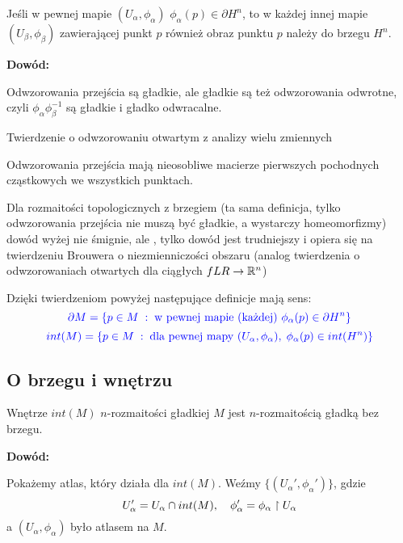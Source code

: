 \begin{fakt}
Jeśli w pewnej mapie $(U_\alpha,\phi_\alpha)$ $\phi_\alpha(p)\in\partial H^n$, to w każdej innej mapie $(U_\beta,\phi_\beta)$ zawierającej punkt $p$ również obraz punktu $p$ należy do brzegu $H^n$.
\end{fakt}

\textbf{Dowód:}

Odwzorowania przejścia są gładkie, ale gładkie są też odwzorowania odwrotne, czyli $\phi_\alpha\phi_\beta^{-1}$ są gładkie i gładko odwracalne.

Twierdzenie o odwzorowaniu otwartym z analizy wielu zmiennych

Odwzorowania przejścia mają nieosobliwe macierze pierwszych pochodnych cząstkowych we wszystkich punktach.
\proofend
\medskip

\begin{uwaga}
    Dla rozmaitości topologicznych z brzegiem (ta sama definicja, tylko odwzorowania przejścia nie muszą być gładkie, a wystarczy homeomorfizmy) dowód wyżej nie śmignie, ale , tylko dowód jest trudniejszy i opiera się na twierdzeniu Brouwera o niezmienniczości obszaru (analog twierdzenia o odwzorowaniach otwartych dla ciągłych $fLR\to\mathbb{R}^n$)
\end{uwaga}

Dzięki twierdzeniom powyżej następujące definicje mają sens:
$$\color{blue}\partial M=\{p\in M\;:\;\text{w pewnej mapie (każdej) }\phi_\alpha(p)\in\partial H^n\}$$ 
$$\color{blue}int(M)=\{p\in M\;:\;\text{dla pewnej mapy }(U_\alpha,\phi_\alpha),\;\phi_\alpha(p)\in int(H^n)\}$$

\subsection{O brzegu i wnętrzu}

\begin{fakt}
    Wnętrze $int(M)$ $n$-rozmaitości gładkiej $M$ jest $n$-rozmaitością gładką bez brzegu.
\end{fakt}

\textbf{Dowód:} 

Pokażemy atlas, który działa dla $int(M)$. Weźmy $\{(U_\alpha',\phi_\alpha')\}$, gdzie
$$U_\alpha'=U_\alpha\cap int(M),\quad \phi_\alpha'=\phi_\alpha\upharpoonright U_\alpha$$
a $(U_\alpha,\phi_\alpha)$ było atlasem na $M$.
\proofend

